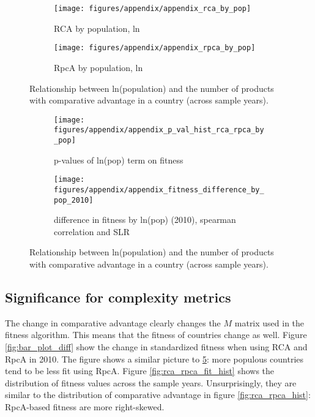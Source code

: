 \documentclass[11pt]{article}
\begin{document}
\begin{appendices}
\begin{figure}
     \centering
     \begin{subfigure}[b]{0.45\textwidth}
         \centering
         \texttt{[image: figures/appendix/appendix\_rca\_by\_pop]}
         \caption{RCA by population, ln}
         \label{fig:rca_by_pop}
     \end{subfigure}
     \hfill
     \begin{subfigure}[b]{0.45\textwidth}
         \centering
         \texttt{[image: figures/appendix/appendix\_rpca\_by\_pop]}
         \caption{RpcA by population, ln}
         \label{fig:rpca_by_pop}
     \end{subfigure}
	 \caption{Relationship between ln(population) and the number of products
	   with comparative advantage in a country (across sample years).}
        \label{fig:rca_rpca_by_pop}
\end{figure}

\begin{figure}
     \centering
     \begin{subfigure}[b]{0.45\textwidth}
         \centering
         \texttt{[image: figures/appendix/appendix\_p\_val\_hist\_rca\_rpca\_by\_pop]}
         \caption{p-values of ln(pop) term on fitness}
         \label{fig:p_val_hist_pop}
     \end{subfigure}
     \hfill
     \begin{subfigure}[b]{0.45\textwidth}
       \centering
         \texttt{[image: figures/appendix/appendix\_fitness\_difference\_by\_pop\_2010]}
         \caption{difference in fitness by ln(pop) (2010), spearman correlation and SLR}
         \label{fig:stand_diff_fit_pop}
     \end{subfigure}
	 \caption{Relationship between ln(population) and the number of products with comparative advantage in a country (across sample years).}
        \label{fig:population_difference}
\end{figure}

\subsection{Significance for complexity metrics}
\label{subsec:significance_for_complexity}

The change in comparative advantage clearly changes the $M$ matrix used in the fitness algorithm. This means that the fitness of countries change as well. Figure \ref{fig:bar_plot_diff} show the change in standardized fitness when using RCA and RpcA in 2010. The figure shows a similar picture to \ref{fig:stand_diff_fit_pop}: more populous countries tend to be less fit using RpcA. Figure \ref{fig:rca_rpca_fit_hist} shows the distribution of fitness values across the sample years. Unsurprisingly, they are similar to the distribution of comparative advantage in figure \ref{fig:rca_rpca_hist}: RpcA-based fitness are more right-skewed.


\end{appendices}
\end{document}
